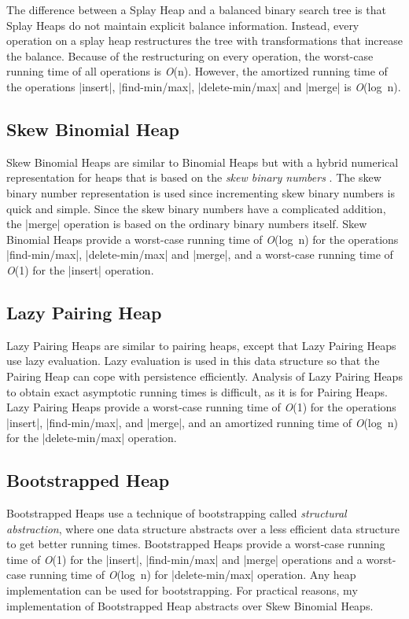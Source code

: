 \noindent
The difference between a Splay Heap and a balanced binary search tree is
that Splay Heaps do not maintain explicit balance information. Instead,
every operation on a splay heap restructures the tree with
transformations that increase the balance. Because of the restructuring
on every operation, the worst-case running time of all operations is
\emph{O}(n). However, the amortized running time of the operations
\scheme|insert|, \scheme|find-min/max|, \scheme|delete-min/max| and
\scheme|merge| is \emph{O}(log~n).

\subsection*{Skew Binomial Heap}
Skew Binomial Heaps are similar to Binomial Heaps but with a hybrid
numerical representation for heaps that is based on the \emph{skew
  binary numbers} \citep{skew}. The skew binary number representation is
used since incrementing skew binary numbers is quick and simple. Since
the skew binary numbers have a complicated addition, the \scheme|merge|
operation is based on the ordinary binary numbers itself. Skew Binomial
Heaps provide a worst-case running time of \emph{O}(log~n) for the
operations \scheme|find-min/max|, \scheme|delete-min/max| and
\scheme|merge|, and a worst-case running time of \emph{O}(1) for the
\scheme|insert| operation.

\subsection*{Lazy Pairing Heap}
Lazy Pairing Heaps \citep{oka} are similar to pairing heaps, except that
Lazy Pairing Heaps use lazy evaluation.  Lazy evaluation is used in this
data structure so that the Pairing Heap can cope with persistence
efficiently. Analysis of Lazy Pairing Heaps to obtain exact asymptotic
running times is difficult, as it is for Pairing Heaps. Lazy Pairing
Heaps provide a worst-case running time of \emph{O}(1) for the
operations \scheme|insert|, \scheme|find-min/max|, and \scheme|merge|,
and an amortized running time of \emph{O}(log~n) for the
\scheme|delete-min/max| operation.

\subsection*{Bootstrapped Heap}
Bootstrapped Heaps \citep{oka} use a technique of bootstrapping called
\emph{structural abstraction}, where one data structure abstracts over a
less efficient data structure to get better running times.  Bootstrapped
Heaps provide a worst-case running time of \emph{O}(1) for the
\scheme|insert|, \scheme|find-min/max| and \scheme|merge| operations and
a worst-case running time of \emph{O}(log~n) for \scheme|delete-min/max|
operation. Any heap implementation can be used for bootstrapping. For
practical reasons, my implementation of Bootstrapped Heap abstracts over
Skew Binomial Heaps.

